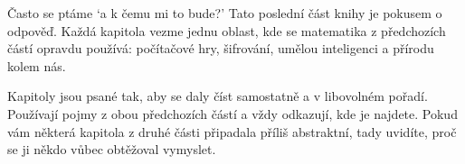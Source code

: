 
Často se ptáme `a k čemu mi to bude?' Tato poslední část knihy je pokusem o odpověď. Každá kapitola vezme jednu oblast, kde se matematika z předchozích částí opravdu používá: počítačové hry, šifrování, umělou inteligenci a přírodu kolem nás.

Kapitoly jsou psané tak, aby se daly číst samostatně a v libovolném pořadí. Používají pojmy z obou předchozích částí a vždy odkazují, kde je najdete. Pokud vám některá kapitola z druhé části připadala příliš abstraktní, tady uvidíte, proč se ji někdo vůbec obtěžoval vymyslet.
